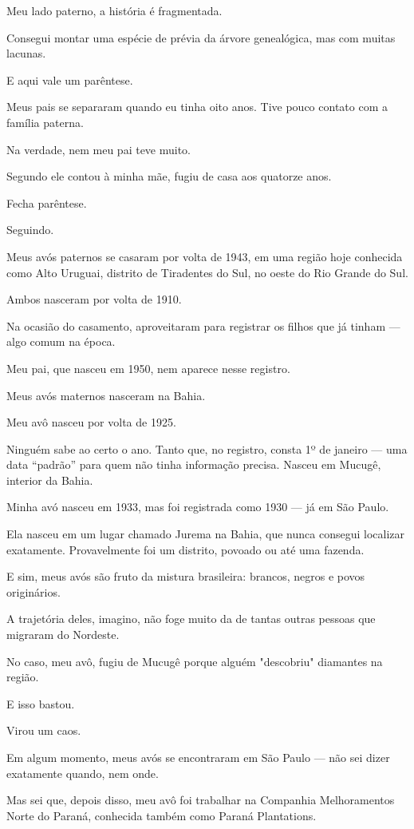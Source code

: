 
Meu lado paterno, a história é fragmentada.

Consegui montar uma espécie de prévia da árvore genealógica, mas com muitas lacunas.

E aqui vale um parêntese.

Meus pais se separaram quando eu tinha oito anos. Tive pouco contato com a família paterna. 

Na verdade, nem meu pai teve muito.

Segundo ele contou à minha mãe, fugiu de casa aos quatorze anos.

Fecha parêntese.

Seguindo.

Meus avós paternos se casaram por volta de 1943, em uma região hoje conhecida como Alto Uruguai, distrito de Tiradentes do Sul, no oeste do Rio Grande do Sul.

Ambos nasceram por volta de 1910.

Na ocasião do casamento, aproveitaram para registrar os filhos que já tinham — algo comum na época.

Meu pai, que nasceu em 1950, nem aparece nesse registro.

Meus avós maternos nasceram na Bahia.

Meu avô nasceu por volta de 1925. 

Ninguém sabe ao certo o ano. Tanto que, no registro, consta 1º de janeiro — uma data “padrão” para quem não tinha informação precisa. Nasceu em Mucugê, interior da Bahia.

Minha avó nasceu em 1933, mas foi registrada como 1930 — já em São Paulo. 

Ela nasceu em um lugar chamado Jurema na Bahia, que nunca consegui localizar exatamente. Provavelmente foi um distrito, povoado ou até uma fazenda.

E sim, meus avós são fruto da mistura brasileira: brancos, negros e povos originários.

A trajetória deles, imagino, não foge muito da de tantas outras pessoas que migraram do Nordeste.

No caso, meu avô, fugiu de Mucugê porque alguém "descobriu" diamantes na região.

E isso bastou.

Virou um caos.

Em algum momento, meus avós se encontraram em São Paulo — não sei dizer exatamente quando, nem onde.

Mas sei que, depois disso, meu avô foi trabalhar na Companhia Melhoramentos Norte do Paraná, conhecida também como Paraná Plantations.

